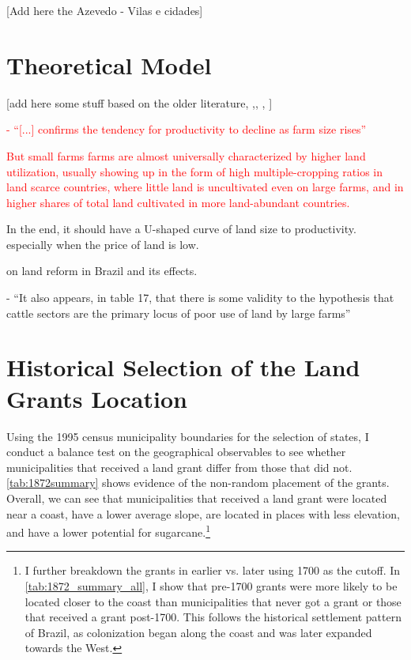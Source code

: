 \documentclass[11pt]{article}
\newcommand{\red}[1]{\textcolor{red}{#1}}
\begin{document}
[Add here the Azevedo - Vilas e cidades]

\section{Theoretical Model}
\label{sec:theory}

[add here some stuff based on the older literature, \parencite{Carter1984-aj} ,\parencite{Benjamin1995-ca}, \parencite{Benjamin1992-tk}, \parencite{Berry1979-ct}]

\red{\parencite[p.~134]{Berry1979-ct} - ``[...] confirms the tendency for productivity to decline as farm size rises''}

\red{\parencite[p.~134]{Berry1979-ct} But small farms farms are almost universally characterized by higher land utilization, usually showing up in the form of high multiple-cropping ratios in land scarce countries, where little land is uncultivated even on large farms, and in higher shares of total land cultivated in more land-abundant countries.}

In the end, it should have a U-shaped curve of land size to productivity. especially when the price of land is low.

\parencite{Cline1970-pk} on land reform in Brazil and its effects.

\parencite{Cline1970-pk} - ``It also appears, in table 17, that there is some validity to the hypothesis that cattle sectors are the primary locus of poor use of land by large farms''

\section{Historical Selection of the Land Grants Location}
\label{sec:selection}


Using the 1995 census municipality boundaries for the selection of states, I conduct a balance test on the geographical observables to see whether municipalities that received a land grant differ from those that did not.
\autoref{tab:1872summary} shows evidence of the non-random placement of the grants.
Overall, we can see that municipalities that received a land grant were located near a coast, have a lower average slope, are located in places with less elevation, and have a lower potential for sugarcane.\footnote{I further breakdown the grants in earlier vs. later using 1700 as the cutoff. In \autoref{tab:1872_summary_all}, I show that pre-1700 grants were more likely to be located closer to the coast than municipalities that never got a grant or those that received a grant post-1700. This follows the historical settlement pattern of Brazil, as colonization began along the coast and was later expanded towards the West.} 
\end{document}
